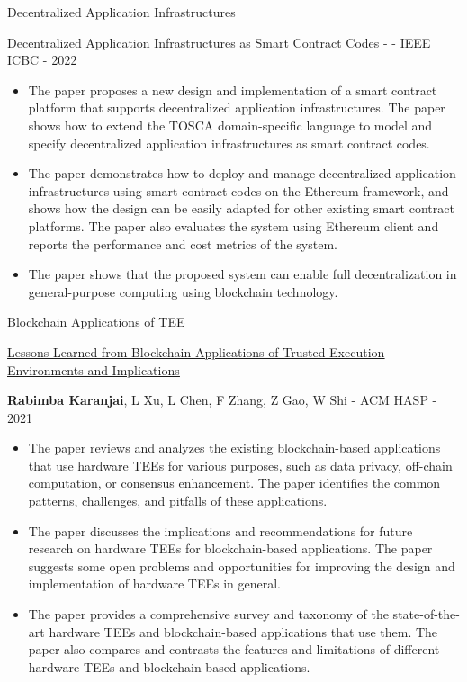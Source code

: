 \documentclass[10pt,aspectratio=169]{beamer}
\begin{document}
\begin{frame}[fragile]{Decentralized Application Infrastructures}

{\href{https://ieeexplore.ieee.org/document/9805493}{\underline{Decentralized Application Infrastructures as Smart Contract Codes - }}}
    {} - {IEEE ICBC} - {2022}
\begin{itemize} \item The paper proposes a new design and implementation of a smart contract platform that supports decentralized application infrastructures. The paper shows how to extend the TOSCA domain-specific language to model and specify decentralized application infrastructures as smart contract codes. \item The paper demonstrates how to deploy and manage decentralized application infrastructures using smart contract codes on the Ethereum framework, and shows how the design can be easily adapted for other existing smart contract platforms. The paper also evaluates the system using Ethereum client and reports the performance and cost metrics of the system. \item The paper shows that the proposed system can enable full decentralization in general-purpose computing using blockchain technology.  \end{itemize}
\end{frame}

\begin{frame}[fragile]{Blockchain Applications of TEE}

{\href{https://dl.acm.org/doi/abs/10.1145/3505253.3505259}{\underline{Lessons Learned from Blockchain Applications of Trusted Execution Environments and Implications}}} 

{\textbf{Rabimba Karanjai}, L Xu, L Chen, F Zhang, Z Gao, W Shi} - {ACM HASP} - {2021}
\begin{itemize} \item The paper reviews and analyzes the existing blockchain-based applications that use hardware TEEs for various purposes, such as data privacy, off-chain computation, or consensus enhancement. The paper identifies the common patterns, challenges, and pitfalls of these applications. \item The paper discusses the implications and recommendations for future research on hardware TEEs for blockchain-based applications. The paper suggests some open problems and opportunities for improving the design and implementation of hardware TEEs in general. \item The paper provides a comprehensive survey and taxonomy of the state-of-the-art hardware TEEs and blockchain-based applications that use them. The paper also compares and contrasts the features and limitations of different hardware TEEs and blockchain-based applications. \end{itemize}
\end{frame}
\end{document}
